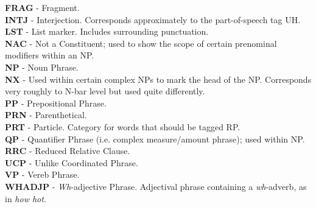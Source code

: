 \textbf{FRAG} - Fragment.\\



\textbf{INTJ} - Interjection.  Corresponds approximately to the part-of-speech tag UH.\\



\textbf{LST} - List marker.  Includes surrounding punctuation.\\



\textbf{NAC} - Not a Constituent; used to show the scope of certain prenominal modifiers within an NP.\\



\textbf{NP} - Noun Phrase. \\



\textbf{NX} - Used within certain complex NPs to mark the head of the NP.  Corresponds very roughly to N-bar level but used  
quite differently.\\



\textbf{PP} - Prepositional Phrase.\\



\textbf{PRN} - Parenthetical. \\



\textbf{PRT} - Particle.  Category for words that should be tagged RP. \\



\textbf{QP} - Quantifier Phrase (i.e. complex measure/amount phrase); used within NP.\\



\textbf{RRC} - Reduced Relative Clause. \\



\textbf{UCP} - Unlike Coordinated Phrase. \\



\textbf{VP} - Vereb Phrase. \\



\textbf{WHADJP} - \textit{Wh}-adjective Phrase.  Adjectival phrase containing a \textit{wh}-adverb, as in \textit{how hot}.\\



